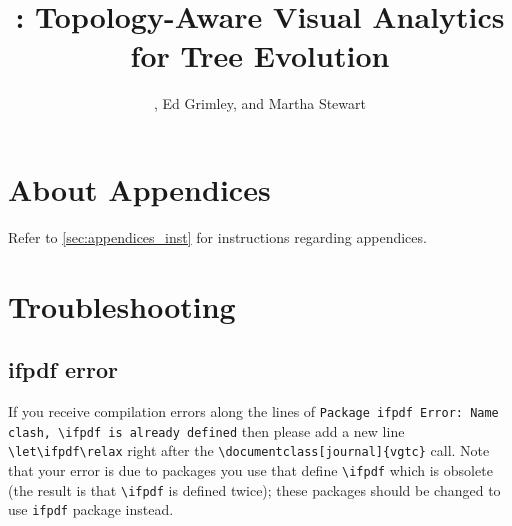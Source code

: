 \documentclass[review,journal]{vgtc}              %
\title{\sysname: Topology-Aware Visual Analytics for Tree Evolution}
\author{%
	\authororcid{Josiah S.\ Carberry}{0000-0002-1825-0097},
	Ed Grimley, and 
	Martha Stewart
}
\begin{document}
	
	
		
		
		
		
		
				
%		
		
		
		
		
		
		
		
		
		
		
		
		
		
		
		
		\appendix %
		
		\section{About Appendices}
		Refer to \cref{sec:appendices_inst} for instructions regarding appendices.
		
		\section{Troubleshooting}
		\label{appendix:troubleshooting}
		
		\subsection{ifpdf error}
		
		If you receive compilation errors along the lines of \texttt{Package ifpdf Error: Name clash, \textbackslash ifpdf is already defined} then please add a new line \verb|\let\ifpdf\relax| right after the \verb|\documentclass[journal]{vgtc}| call.
		Note that your error is due to packages you use that define \verb|\ifpdf| which is obsolete (the result is that \verb|\ifpdf| is defined twice); these packages should be changed to use \verb|ifpdf| package instead.
		
\end{document}
